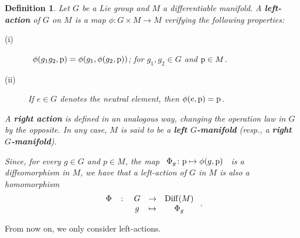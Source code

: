 \documentclass[12pt]{report}
\newtheorem{definition}[teor]{Definition}
\def\Diff{{\rm Diff}}
\begin{document}
\begin{definition}
Let $G$ be a Lie group and $M$ a differentiable manifold.
A \textbf{left-action} of $G$ on $M$ is a map
$\phi \colon G \times M \to M$
verifying the following properties:
\begin{description}
\item[{\rm (i)}] \ 
$\phi(g_1g_2,{\rm p}) = \phi (g_1,\phi (g_2,{\rm p}))$;
for $g_1,g_2\in G$ and ${\rm p}\in M$.
\item[{\rm (ii)}]
If $e\in G$ denotes the neutral element, then
$\phi (e,{\rm p}) = {\rm p}$.
\end{description}
A \textbf{right action} is defined in an analogous way,
changing the operation law in $G$ by the opposite.
In any case, $M$ is said to be a
\textbf{left $G$-manifold} (resp., a \textbf{right $G$-manifold}).

Since, for every $g \in G$ and $p\in M$, the map \ 
$\Phi_g \colon {\rm p}\mapsto \phi (g,{\rm p})$ \ 
is a diffeomorphism in $M$, we have that a left-action of $G$ in $M$
is also a homomorphism
$$
\begin{array}{ccccc}
\Phi&\colon&G&\to&\Diff (M)
\\
& &g&\mapsto&\Phi_g
\end{array} \ .
$$
\end{definition}

From now on, we only consider left-actions.
\end{document}
